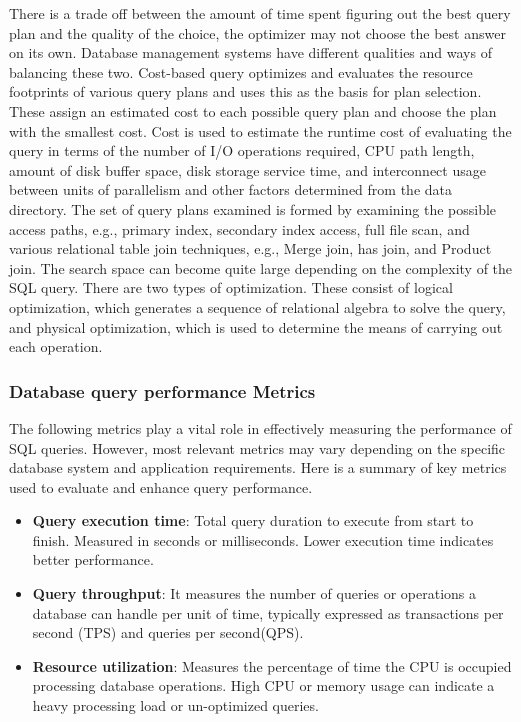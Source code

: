There is a trade off between the amount of time spent figuring out the best query plan and the quality of the choice, the optimizer may not choose the best answer on its own. Database management systems have different qualities and ways of balancing these two. Cost-based query optimizes and evaluates the resource footprints of various query plans and uses this as the basis for plan selection. These assign an estimated cost to each possible query plan and choose the plan with the smallest cost. Cost is used to estimate the runtime cost of evaluating the query in terms of the number of I/O operations required, CPU path length, amount of disk buffer space, disk storage service time, and interconnect usage between units of parallelism and other factors determined from the data directory. The set of query plans examined is formed by examining the possible access paths, e.g., primary index, secondary index access, full file scan, and various relational table join techniques, e.g., Merge join, has join, and Product join. The search space can become quite large depending on the complexity of the SQL query. There are two types of optimization. These consist of logical optimization, which generates a sequence of relational algebra to solve the query, and physical optimization, which is used to determine the means of carrying out each operation.\cite{dremio-2024}


\subsubsection{Database query performance Metrics}
The following metrics play a vital role in effectively measuring the performance of SQL queries. However, most relevant metrics may vary depending on the specific database system and application requirements.
Here is a summary of key metrics used to evaluate and enhance query performance.\cite{chwesewicz-2024}
\begin{itemize}
    \item\textbf{Query execution time}: Total query duration to execute from start to finish. Measured in seconds or milliseconds. Lower execution time indicates better performance.
    \item\textbf{Query throughput}: It measures the number of queries or operations a database can handle per unit of time, typically expressed as transactions per second (TPS) and queries per second(QPS).
    \item\textbf{Resource utilization}: Measures the percentage of time the CPU is occupied processing database operations. High CPU or memory usage can indicate a heavy processing load or un-optimized queries.
\end{itemize}
